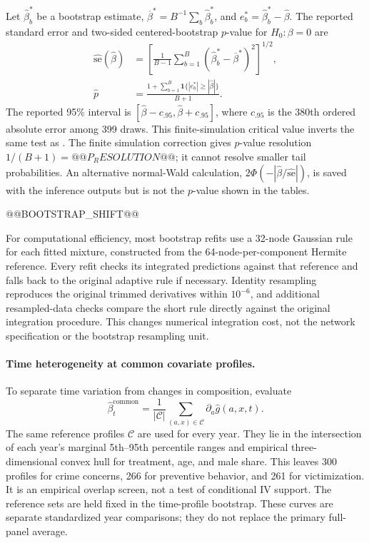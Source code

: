 Let $\widehat\beta_b^*$ be a bootstrap estimate, $\overline\beta^*=B^{-1}\sum_b\widehat\beta_b^*$, and $e_b^*=\widehat\beta_b^*-\widehat\beta$. The reported standard error and two-sided centered-bootstrap $p$-value for $H_0:\beta=0$ are
\begin{align}
\widehat{\mathrm{se}}(\widehat\beta)
&=\left[\frac{1}{B-1}\sum_{b=1}^{B}
(\widehat\beta_b^*-\overline\beta^*)^2\right]^{1/2},\\
\widehat p
&=\frac{1+\sum_{b=1}^{B}\mathbf1\{|e_b^*|\geq|\widehat\beta|\}}{B+1}.
\label{eq:neural-bootstrap-p}
\end{align}
The reported 95\% interval is $[\widehat\beta-c_{.95},\widehat\beta+c_{.95}]$, where $c_{.95}$ is the 380th ordered absolute error among 399 draws. This finite-simulation critical value inverts the same test as .
The finite simulation correction gives $p$-value resolution $1/(B+1)=@@P_RESOLUTION@@$; it cannot resolve smaller tail probabilities. An alternative normal-Wald calculation, $2\Phi(-|\widehat\beta/\widehat{\mathrm{se}}|)$, is saved with the inference outputs but is not the $p$-value shown in the tables.

@@BOOTSTRAP_SHIFT@@

For computational efficiency, most bootstrap refits use a 32-node Gaussian rule for each fitted mixture, constructed from the 64-node-per-component Hermite reference. Every refit checks its integrated predictions against that reference and falls back to the original adaptive rule if necessary. Identity resampling reproduces the original trimmed derivatives within $10^{-6}$, and additional resampled-data checks compare the short rule directly against the original integration procedure. This changes numerical integration cost, not the network specification or the bootstrap resampling unit.

\paragraph{Time heterogeneity at common covariate profiles.}
To separate time variation from changes in composition, evaluate
\begin{equation}
\widehat\beta_t^{\mathrm{common}}
=\frac1{|\mathcal C|}\sum_{(a,x)\in\mathcal C}\partial_a\widehat g(a,x,t).
\end{equation}
The same reference profiles $\mathcal C$ are used for every year. They lie in the intersection of each year's marginal 5th--95th percentile ranges and empirical three-dimensional convex hull for treatment, age, and male share. This leaves 300 profiles for crime concerns, 266 for preventive behavior, and 261 for victimization. It is an empirical overlap screen, not a test of conditional IV support. The reference sets are held fixed in the time-profile bootstrap. These curves are separate standardized year comparisons; they do not replace the primary full-panel average.

